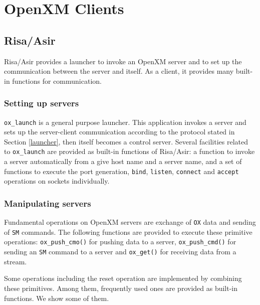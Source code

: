 
\section{OpenXM Clients}    

\subsection{Risa/Asir}

Risa/Asir provides a launcher to invoke an OpenXM server and to set up the
communication between the server and itself. As a client, 
it provides many built-in functions for communication.

\subsubsection{Setting up servers}
{\tt ox\_launch} is a general purpose launcher.  This application
invokes a server and sets up the server-client communication
according to the protocol stated in Section \ref{launcher}, then
itself becomes a control server.
Several facilities related to {{\tt ox\_launch}} are provided
as built-in functions of Risa/Asir: a function to invoke a server
automatically from a give host name and a server name, and a set 
of functions to execute the port generation, {\tt bind}, {\tt listen},
{\tt connect} and {\tt accept} operations on sockets individually.

\subsubsection{Manipulating servers}
Fundamental operations on OpenXM servers are 
exchange of {\tt OX} data and sending of {\tt SM} commands.
The following functions
are provided to execute these primitive operations:
{\tt ox\_push\_cmo()} for pushing data to a server, 
{\tt ox\_push\_cmd()} for sending an {\tt SM} command to a server
and {\tt ox\_get()} for receiving data from a stream.

Some operations including the reset operation are implemented by
combining these primitives.  Among them, frequently used ones are
provided as built-in functions. We show some of them.


